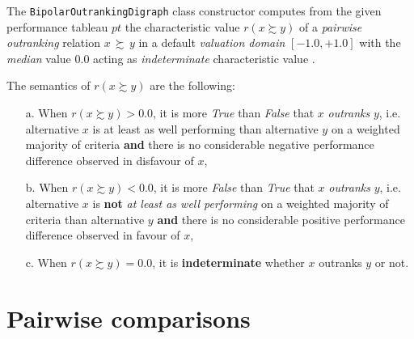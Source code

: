 The \texttt{BipolarOutrankingDigraph} class constructor computes from the given performance tableau $pt$ the characteristic value $r(x \succsim y)$ of a \emph{pairwise outranking} relation $x\, \succsim \,y$ in a default \emph{valuation domain} $[-1.0,+1.0]$ with the {\em median\/} value $0.0$ acting as \emph{indeterminate} characteristic value \citep{BIS-2013}. 

\begin{definition} The semantics of $r(x \succsim y)$ are the following:
\begin{itemize}
\item [a.] When $r(x \succsim y) > 0.0$, it is more {\em True\/} than {\em False\/} that $x$ \emph{outranks} $y$, i.e. alternative $x$ is at least as well performing than alternative $y$ on a weighted majority of criteria {\bf and} there is no considerable negative performance difference observed in disfavour of $x$,
\item [b.] When $r(x \succsim y) < 0.0$, it is more {\em False\/} than {\em True\/} that $x$ \emph{outranks} $y$, i.e. alternative $x$ is {\bf not} \emph{at least as well performing} on a weighted majority of criteria than alternative $y$ {\bf and} there is no considerable positive performance difference observed in favour of $x$,
\item [c.] When $r(x \succsim y) = 0.0$, it is {\bf indeterminate} whether $x$ outranks $y$ or not.
\end{itemize}
\end{definition}

\section{Pairwise comparisons}
\label{sec:3.3}

